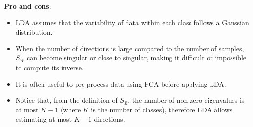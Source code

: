 \vspace{0.5cm}

\textbf{Pro and cons}:
\begin{itemize}
	\item LDA assumes that the variability of data within each class follows a Gaussian distribution.
	\item When the number of directions is large compared to the number of samples, $S_W$ can become singular or close to singular, making it difficult or impossible to compute its inverse.
	\item It is often useful to pre-process data using PCA before applying LDA.
	\item Notice that, from the definition of $S_B$, the number of non-zero eigenvalues is at most $K-1$ (where $K$ is the number of classes), therefore LDA allows estimating at most $K-1$ directions.
\end{itemize}